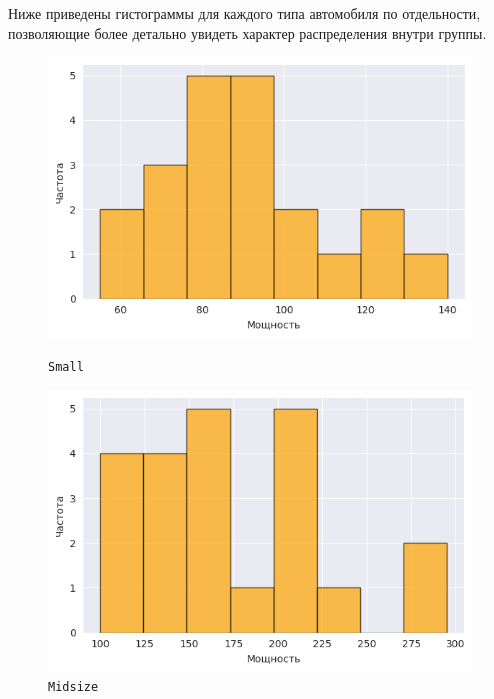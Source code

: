 \documentclass[a4paper,12pt]{article}
\begin{document}
Ниже приведены гистограммы для каждого типа автомобиля по отдельности, позволяющие более детально увидеть характер распределения внутри группы.

\begin{figure}[H]
    \centering
    \begin{minipage}{0.45\textwidth}
        \centering
        \includegraphics[width=\textwidth]{images/hist_small.png}
        \caption{\texttt{Small}}
    \end{minipage}
    \quad
    \begin{minipage}{0.45\textwidth}
        \centering
        \includegraphics[width=\textwidth]{images/hist_midsize.png}
        \caption{\texttt{Midsize}}
    \end{minipage}
    

\end{figure}
\end{document}
